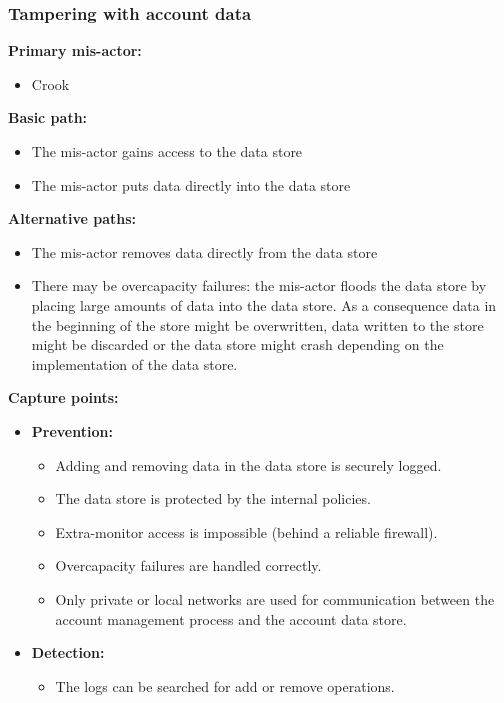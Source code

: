 \documentclass[a4paper,11pt]{report}
\begin{document}
\subsubsection{Tampering with account data}
\label{AccountDataCasesT}
\textbf{Primary mis-actor:}
\begin{itemize}
\item Crook
\end{itemize}
\textbf{Basic path:}
\begin{itemize}
\item The mis-actor gains access to the data store
\item The mis-actor puts data directly into the data store
\end{itemize}
\textbf{Alternative paths:}
\begin{itemize}
\item The mis-actor removes data directly from the data store
\item There may be overcapacity failures: the mis-actor floods the data store by placing large
amounts of data into the data store. As a consequence data in the beginning of the store might be overwritten, data written to the store might be discarded or the data store might crash depending on the implementation of
the data store.
\end{itemize}
\textbf{Capture points:}
\begin{itemize}
\item \textbf{Prevention:}
\begin{itemize}
\item Adding and removing data in the data store is securely logged.
\item The data store is protected by the internal policies.
\item Extra-monitor access is impossible (behind a reliable firewall).
\item Overcapacity failures are handled correctly.
\item Only private or local networks are used for communication between the account management process
and the account data store.
\end{itemize}
\item \textbf{Detection:}
\begin{itemize}
\item The logs can be searched for add or remove operations.
\end{itemize}
\end{itemize}
\end{document}
